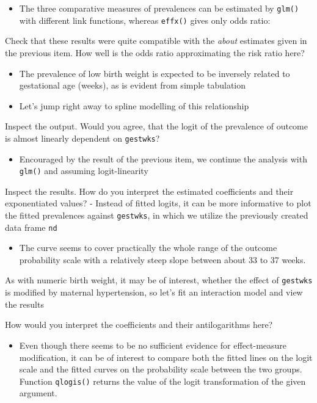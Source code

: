 \documentclass[
]{book}
\providecommand{\tightlist}{%
  \setlength{\itemsep}{0pt}\setlength{\parskip}{0pt}}
\begin{document}
\begin{itemize}
\tightlist
\item
  The three comparative measures of prevalences can be
  estimated by \texttt{glm()} with different link functions, whereas
  \texttt{effx()} gives only odds ratio:
\end{itemize}

Check that these results were quite compatible with the
\emph{about} estimates given in the previous item.
How well is the odds ratio approximating the risk ratio here?

\begin{itemize}
\item
  The prevalence of low birth weight is expected to be inversely related
  to gestational age (weeks), as is evident from simple tabulation
\item
  Let's jump right away to spline modelling of this relationship
\end{itemize}

Inspect the output. Would you agree, that the logit of the prevalence
of outcome is almost linearly dependent on \texttt{gestwks}?

\begin{itemize}
\tightlist
\item
  Encouraged by the result of the previous item, we continue the analysis
  with \texttt{glm()} and assuming logit-linearity
\end{itemize}

Inspect the results. How do you interpret the estimated coefficients
and their exponentiated values?
-
Instead of fitted logits, it can be more informative
to plot the fitted prevalences against \texttt{gestwks},
in which we utilize the previously created data frame \texttt{nd}

\begin{itemize}
\tightlist
\item
  The curve seems to cover practically the whole range of
  the outcome probability scale with a relatively
  steep slope between about 33 to 37 weeks.
\end{itemize}

As with numeric birth weight, it may be of interest,
whether the effect of \texttt{gestwks} is modified
by maternal hypertension, so let's fit
an interaction model and view the results

How would you interpret the coefficients and their antilogarithms here?

\begin{itemize}
\tightlist
\item
  Even though there seems to be no sufficient evidence
  for effect-measure modification, it can be of interest
  to compare both the fitted lines on the logit scale
  and the fitted curves on the probability scale between
  the two groups. Function \texttt{qlogis()} returns the
  value of the logit transformation of the given argument.
\end{itemize}
\end{document}
